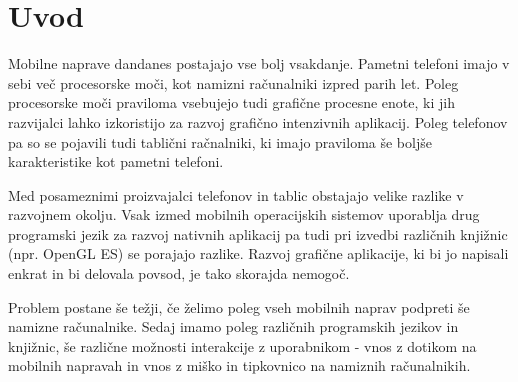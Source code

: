 \chapter{Uvod}

Mobilne naprave dandanes postajajo vse bolj vsakdanje. Pametni telefoni imajo v sebi več procesorske moči, kot namizni računalniki izpred parih let. Poleg procesorske moči praviloma vsebujejo tudi grafične procesne enote, ki jih razvijalci lahko izkoristijo za razvoj grafično intenzivnih aplikacij. Poleg telefonov pa so se pojavili tudi tablični račnalniki, ki imajo praviloma še boljše karakteristike kot pametni telefoni. 

Med posameznimi proizvajalci telefonov in tablic obstajajo velike razlike v razvojnem okolju. Vsak izmed mobilnih operacijskih sistemov uporablja drug programski jezik za razvoj nativnih aplikacij pa tudi pri izvedbi različnih knjižnic (npr. OpenGL ES) se porajajo razlike. Razvoj grafične aplikacije, ki bi jo napisali enkrat in bi delovala povsod, je tako skorajda nemogoč.

Problem postane še težji, če želimo poleg vseh mobilnih naprav podpreti še namizne računalnike. Sedaj imamo poleg različnih programskih jezikov in knjižnic, še različne možnosti interakcije z uporabnikom - vnos z dotikom na mobilnih napravah in vnos z miško in tipkovnico na namiznih računalnikih.
